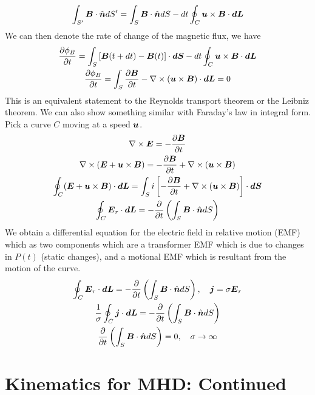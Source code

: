 \documentclass{article}
\begin{document}
\begin{gather*}
    \int_{S'} \boldsymbol{B}\cdot\hat{\boldsymbol{n}} dS' = \int_{S}\boldsymbol{B}\cdot\hat{\boldsymbol{n}} dS - dt\oint_{C}
    \boldsymbol{u}\times\boldsymbol{B} \cdot \boldsymbol{dL}
\end{gather*}
We can then denote the rate of change of the magnetic flux, we have
\begin{gather*}
    \frac{\partial \phi_B}{\partial t} = \int_S \left[\boldsymbol{B}(t+dt)-\boldsymbol{B}(t)\right]\cdot\boldsymbol{dS}-
    dt\oint_{C}\boldsymbol{u}\times\boldsymbol{B}\cdot\boldsymbol{dL}\\
    \frac{\partial \phi_B}{\partial t} = \int_S \frac{\partial \boldsymbol{B}}{\partial t} - \nabla\times(\boldsymbol{u}\times\boldsymbol{B})\cdot\boldsymbol{dL} = 0\\
\end{gather*}
This is an equivalent statement to the Reynolds transport theorem or the Leibniz
theorem. We can also show something similar with Faraday's law in integral form. 
Pick a curve $C$ moving at a speed $\boldsymbol{u}$. 
\begin{gather*}
    \nabla\times\boldsymbol{E} = -\frac{\partial \boldsymbol{B}}{\partial t}\\
    \nabla\times(\boldsymbol{E} + \boldsymbol{u}\times\boldsymbol{B}) = -\frac{\partial \boldsymbol{B}}{\partial t} + \nabla\times(\boldsymbol{u}\times\boldsymbol{B})\\
    \oint_C (\boldsymbol{E} + \boldsymbol{u}\times\boldsymbol{B})\cdot\boldsymbol{dL} = \int_Si\left[-\frac{\partial \boldsymbol{B}}{\partial t} +
    \nabla\times(\boldsymbol{u}\times\boldsymbol{B})\right] \cdot\boldsymbol{dS}\\
    \oint_C \boldsymbol{E}_r\cdot\boldsymbol{dL} = -\frac{\partial }{\partial t}\left(\int_S\boldsymbol{B}\cdot\hat{\boldsymbol{n}} dS \right)
\end{gather*}
We obtain a differential equation for the electric field in relative motion
(EMF) which as two components which are a transformer EMF which is due to
changes in $P(t)$ (static changes), and a motional EMF which is resultant from the motion of the
curve. 
\begin{gather*}
    \oint_C \boldsymbol{E}_r\cdot\boldsymbol{dL} = -\frac{\partial }{\partial t}\left(\int_S \boldsymbol{B}\cdot\hat{\boldsymbol{n}} dS\right), \quad
    \boldsymbol{j} = \sigma \boldsymbol{E}_r\\
    \frac{1}{\sigma}\oint_C\boldsymbol{j}\cdot\boldsymbol{dL} = -\frac{\partial }{\partial t}\left(\int_S\boldsymbol{B}\cdot\hat{\boldsymbol{n}}
    dS\right)\\
    \frac{\partial }{\partial t}\left(\int_S\boldsymbol{B}\cdot\hat{\boldsymbol{n}} dS\right) = 0, \quad \sigma \to \infty
\end{gather*}


\section{Kinematics for MHD: Continued}
\end{document}
